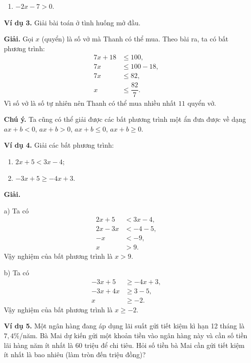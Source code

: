 \begin{lesson}
\begin{enumerate}[label=\alph*)]
        \answerline
        \item $-2x-7>0$.

        \answerline
    \end{enumerate}

    \textbf{Ví dụ 3.} Giải bài toán ở tình huống mở đầu.

    \textbf{Giải.} Gọi $x$ (quyển) là số vở mà Thanh có thể mua. Theo bài ra, ta có bất phương trình:
    \begin{align*}
        7x+18 &\leq 100,\\
        7x &\leq 100-18,\\
        7x &\leq 82,\\
        x &\leq \dfrac{82}{7}.
    \end{align*}
    Vì số vở là số tự nhiên nên Thanh có thể mua nhiều nhất $11$ quyển vở.

    \textbf{Chú ý.} Ta cũng có thể giải được các bất phương trình một ẩn đưa được về dạng $ax+b<0$, $ax+b>0$, $ax+b\leq 0$, $ax+b\geq 0$.

    \textbf{Ví dụ 4.} Giải các bất phương trình:
    \begin{enumerate}[label=\alph*)]
        \item $2x+5<3x-4$;
        \item $-3x+5\geq -4x+3$.
    \end{enumerate}

    \textbf{Giải.}

    a) Ta có
    \begin{align*}
        2x+5 &< 3x-4,\\
        2x-3x &< -4-5,\\
        -x &< -9,\\
        x &> 9.
    \end{align*}
    Vậy nghiệm của bất phương trình là $x>9$.

    b) Ta có
    \begin{align*}
        -3x+5 &\geq -4x+3,\\
        -3x+4x &\geq 3-5,\\
        x &\geq -2.
    \end{align*}
    Vậy nghiệm của bất phương trình là $x\geq -2$.

    \textbf{Ví dụ 5.} Một ngân hàng đang áp dụng lãi suất gửi tiết kiệm kì hạn 12 tháng là $7{,}4\%$/năm. Bà Mai dự kiến gửi một khoản tiền vào ngân hàng này và cần số tiền lãi hàng năm ít nhất là 60 triệu để chi tiêu. Hỏi số tiền bà Mai cần gửi tiết kiệm ít nhất là bao nhiêu (làm tròn đến triệu đồng)?


\end{lesson}
